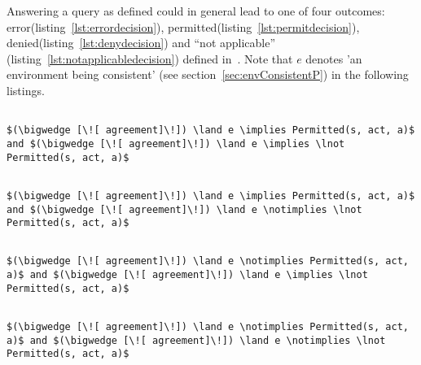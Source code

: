 Answering a query as defined could in general lead to one of four outcomes: error(listing~\ref{lst:errordecision}), permitted(listing~\ref{lst:permitdecision}), denied(listing~\ref{lst:denydecision}) and ``not applicable'' (listing~\ref{lst:notapplicabledecision}) defined in~\cite{Tschantz}. Note that $e$ denotes 'an environment being consistent' (see section~\ref{sec:envConsistentP}) in the following listings.

\lstset{mathescape, language=AST} 
\begin{lstlisting}[frame=single, caption={Answerable Queries: Error},label={lst:errordecision}]

$(\bigwedge [\![ agreement]\!]) \land e \implies Permitted(s, act, a)$ and $(\bigwedge [\![ agreement]\!]) \land e \implies \lnot Permitted(s, act, a)$

\end{lstlisting}

\lstset{mathescape, language=AST} 
\begin{lstlisting}[frame=single, caption={Answerable Queries: Permit},label={lst:permitdecision}]

$(\bigwedge [\![ agreement]\!]) \land e \implies Permitted(s, act, a)$ and $(\bigwedge [\![ agreement]\!]) \land e \notimplies \lnot Permitted(s, act, a)$

\end{lstlisting}

\lstset{mathescape, language=AST} 
\begin{lstlisting}[frame=single, caption={Answerable Queries: Deny},label={lst:denydecision}]

$(\bigwedge [\![ agreement]\!]) \land e \notimplies Permitted(s, act, a)$ and $(\bigwedge [\![ agreement]\!]) \land e \implies \lnot Permitted(s, act, a)$

\end{lstlisting}

\lstset{mathescape, language=AST} 
\begin{lstlisting}[frame=single, caption={Answerable Queries: Not Applicable},label={lst:notapplicabledecision}]

$(\bigwedge [\![ agreement]\!]) \land e \notimplies Permitted(s, act, a)$ and $(\bigwedge [\![ agreement]\!]) \land e \notimplies \lnot Permitted(s, act, a)$

\end{lstlisting}



























